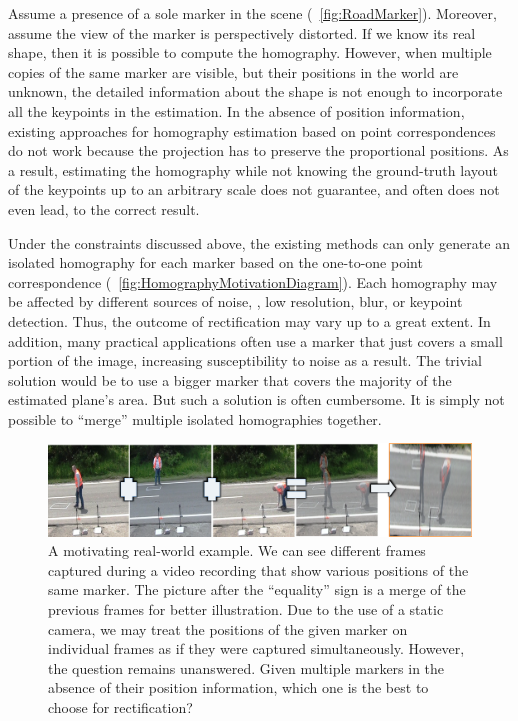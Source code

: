 Assume a presence of a sole marker in the scene (\figtext{}~\ref{fig:RoadMarker}). Moreover, assume the view of the marker is perspectively distorted. If we know its real shape, then it is possible to compute the homography. However, when multiple copies of the same marker are visible, but their positions in the world are unknown, the detailed information about the shape is not enough to incorporate all the keypoints in the estimation. In the absence of position information, existing approaches for homography estimation based on point correspondences do not work because the projection has to preserve the proportional positions. As a result, estimating the homography while not knowing the ground-truth layout of the keypoints up to an arbitrary scale does not guarantee, and often does not even lead, to the correct result.

Under the constraints discussed above, the existing methods can only generate an isolated homography for each marker based on the one-to-one point correspondence (\figtext{}~\ref{fig:HomographyMotivationDiagram}). Each homography may be affected by different sources of noise, \egtext{}, low resolution, blur, or keypoint detection. Thus, the outcome of rectification may vary up to a great extent. In addition, many practical applications often use a marker that just covers a small portion of the image, increasing susceptibility to noise as a result. The trivial solution would be to use a bigger marker that covers the majority of the estimated plane's area. But such a solution is often cumbersome. It is simply not possible to ``merge'' multiple isolated homographies together.

\begin{figure}[t]
    \centerline{\includegraphics[width=\linewidth]{figures/homography/markers_on_the_road.png}}
    \caption[Multiple markers on the road]{A motivating real-world example. We can see different frames captured during a video recording that show various positions of the same marker. The picture after the ``equality'' sign is a merge of the previous frames for better illustration. Due to the use of a static camera, we may treat the positions of the given marker on individual frames as if they were captured simultaneously. However, the question remains unanswered. Given multiple markers in the absence of their position information, which one is the best to choose for rectification?}
    \label{fig:MultipleMarkersOnRoad}
\end{figure}
